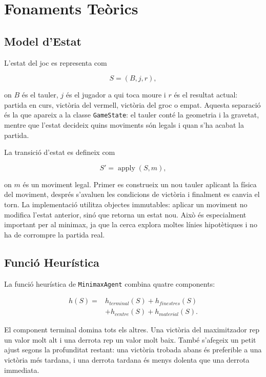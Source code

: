 \documentclass[conference,compsoc]{IEEEtran}
\begin{document}
\section{Fonaments Teòrics}

\subsection{Model d'Estat}

L'estat del joc es representa com

\begin{equation}
    S = (B, j, r),
\end{equation}

on $B$ és el tauler, $j$ és el jugador a qui toca moure i $r$ és el resultat
actual: partida en curs, victòria del vermell, victòria del groc o empat. Aquesta
separació és la que apareix a la classe \texttt{GameState}: el tauler conté la
geometria i la gravetat, mentre que l'estat decideix quins moviments són legals i
quan s'ha acabat la partida.

La transició d'estat es defineix com

\begin{equation}
    S' = \operatorname{apply}(S, m),
\end{equation}

on $m$ és un moviment legal. Primer es construeix un nou tauler aplicant la física
del moviment, després s'avaluen les condicions de victòria i finalment es canvia
el torn. La implementació utilitza objectes immutables: aplicar un moviment no
modifica l'estat anterior, sinó que retorna un estat nou. Això és especialment
important per al minimax, ja que la cerca explora moltes línies hipotètiques i no
ha de corrompre la partida real.

\subsection{Funció Heurística}

La funció heurística de \texttt{MinimaxAgent} combina quatre components:

\begin{equation}
\begin{aligned}
h(S)=&h_{terminal}(S)+h_{finestres}(S)\\
     &+h_{centre}(S)+h_{material}(S).
\end{aligned}
\end{equation}

El component terminal domina tots els altres. Una victòria del maximitzador rep
un valor molt alt i una derrota rep un valor molt baix. També s'afegeix un petit
ajust segons la profunditat restant: una victòria trobada abans és preferible a
una victòria més tardana, i una derrota tardana és menys dolenta que una derrota
immediata.
\end{document}
